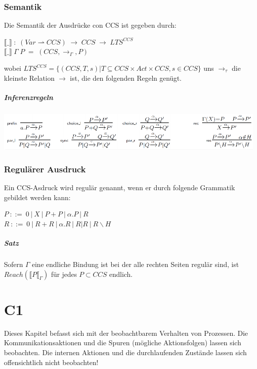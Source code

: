 \documentclass[a4paper,10pt, oneside]{book}
\begin{document}
\subsection{Semantik}
Die Semantik der Ausdrücke con CCS ist gegeben durch:\\
\begin{center}
 $\llbracket\_\rrbracket \; : \; (Var \rightharpoonup CCS) \; \rightarrow \; CCS \; \rightarrow \;  LTS^{CCS}$\\
 $\llbracket\_\rrbracket \; \Gamma \; P \; = \; (CCS, \rightarrow_{\Gamma}, P)$
\end{center}
wobei $LTS^{CCS} = \{(CCS, T, s) | T \subseteq CCS \times Act \times CCS, s \in CCS\}$ uns $\rightarrow_{\tau}$ die kleinste Relation $\rightarrow$ ist, die den folgenden Regeln genügt.

\paragraph{Inferenzregeln}
\begin{center}
 \includegraphics[scale=0.6]{inferenz_ges}
\end{center}

\subsection{Regulärer Ausdruck}
Ein CCS-Asdruck wird regulär genannt, wenn er durch folgende Grammatik gebildet werden kann:
\begin{center}
 $ P \ ::= \  0 \ | \ X \ | \ P+P \ | \ \alpha.P \ | \ R$\\
 $ R \ ::= \ 0 \ | \ R+R \ |\  \alpha.R  \ | \ R|R \ | \ R\backslash H $
\end{center}

\paragraph{Satz}
Sofern $\Gamma$ eine endliche Bindung ist bei der alle rechten Seiten regulär sind, ist $Reach(\llbracket P \llbracket_{\Gamma})$ für jedes $P \subset CCS$ endlich.

\chapter{C1}
Dieses Kapitel befasst sich mit der beobachtbarem Verhalten von Prozessen. Die Kommunikationsaktionen und die Spuren (mögliche Aktionsfolgen) lassen sich beobachten. Die internen Aktionen und die durchlaufenden Zustände lassen sich offensichtlich nicht beobachten!
\end{document}
